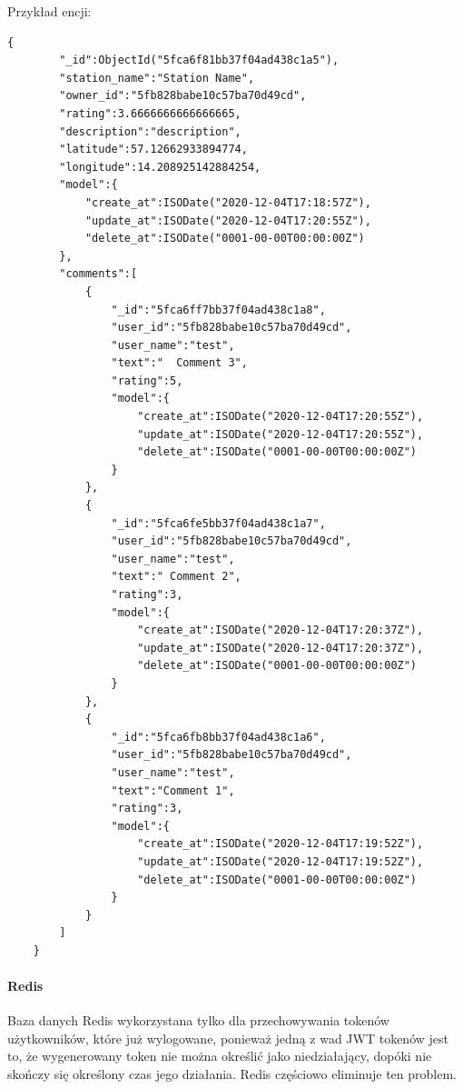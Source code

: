 Przykład encji:
\begin{lstlisting}[basicstyle=\tiny\ttfamily]
    {
        "_id":ObjectId("5fca6f81bb37f04ad438c1a5"),
        "station_name":"Station Name",
        "owner_id":"5fb828babe10c57ba70d49cd",
        "rating":3.6666666666666665,
        "description":"description",
        "latitude":57.12662933894774,
        "longitude":14.208925142884254,
        "model":{
            "create_at":ISODate("2020-12-04T17:18:57Z"),
            "update_at":ISODate("2020-12-04T17:20:55Z"),
            "delete_at":ISODate("0001-00-00T00:00:00Z")
        },
        "comments":[
            {
                "_id":"5fca6ff7bb37f04ad438c1a8",
                "user_id":"5fb828babe10c57ba70d49cd",
                "user_name":"test",
                "text":"  Comment 3",
                "rating":5,
                "model":{
                    "create_at":ISODate("2020-12-04T17:20:55Z"),
                    "update_at":ISODate("2020-12-04T17:20:55Z"),
                    "delete_at":ISODate("0001-00-00T00:00:00Z")
                }
            },
            {
                "_id":"5fca6fe5bb37f04ad438c1a7",
                "user_id":"5fb828babe10c57ba70d49cd",
                "user_name":"test",
                "text":" Comment 2",
                "rating":3,
                "model":{
                    "create_at":ISODate("2020-12-04T17:20:37Z"),
                    "update_at":ISODate("2020-12-04T17:20:37Z"),
                    "delete_at":ISODate("0001-00-00T00:00:00Z")
                }
            },
            {
                "_id":"5fca6fb8bb37f04ad438c1a6",
                "user_id":"5fb828babe10c57ba70d49cd",
                "user_name":"test",
                "text":"Comment 1",
                "rating":3,
                "model":{
                    "create_at":ISODate("2020-12-04T17:19:52Z"),
                    "update_at":ISODate("2020-12-04T17:19:52Z"),
                    "delete_at":ISODate("0001-00-00T00:00:00Z")
                }
            }
        ]
    }
\end{lstlisting}

% 
\paragraph{Redis\newline}
Baza danych Redis wykorzystana tylko dla przechowywania tokenów użytkowników, które już wylogowane, ponieważ jedną z wad JWT tokenów jest to, że wygenerowany token nie można określić jako niedziałający, dopóki nie skończy się określony czas jego działania.
Redis częściowo eliminuje ten problem.

